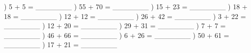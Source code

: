\documentclass{article}%
\begin{document}
\newline%
) 5 + 5 = \_\_\_\_\_\_\_%
\newline%
\newline%
) 55 + 70 = \_\_\_\_\_\_\_%
\newline%
\newline%
) 15 + 23 = \_\_\_\_\_\_\_%
\newline%
\newline%
) 18 + 18 = \_\_\_\_\_\_\_%
\newline%
\newline%
) 12 + 12 = \_\_\_\_\_\_\_%
\newline%
\newline%
) 26 + 42 = \_\_\_\_\_\_\_%
\newline%
\newline%
) 3 + 22 = \_\_\_\_\_\_\_%
\newline%
\newline%
) 12 + 20 = \_\_\_\_\_\_\_%
\newline%
\newline%
) 29 + 31 = \_\_\_\_\_\_\_%
\newline%
\newline%
) 7 + 7 = \_\_\_\_\_\_\_%
\newline%
\newline%
) 46 + 66 = \_\_\_\_\_\_\_%
\newline%
\newline%
) 6 + 26 = \_\_\_\_\_\_\_%
\newline%
\newline%
) 50 + 61 = \_\_\_\_\_\_\_%
\newline%
\newline%
) 17 + 21 = \_\_\_\_\_\_\_%
\newline%
\newline%
\newline%
\end{document}
